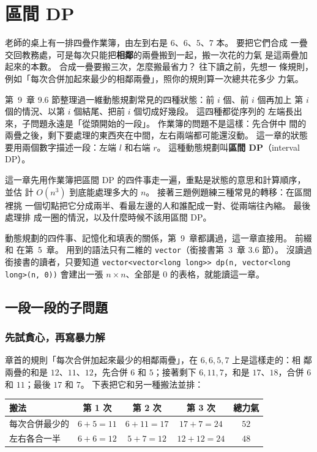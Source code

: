 \chapter{區間 DP}
\label{ch:interval-dp}

老師的桌上有一排四疊作業簿，由左到右是 $6$、$6$、$5$、$7$ 本。 要把它們合成
一疊交回教務處，可是每次只能把\textbf{相鄰}的兩疊搬到一起，搬一次花的力氣
是這兩疊加起來的本數。 合成一疊要搬三次，怎麼搬最省力？ 往下讀之前，先想一
條規則，例如「每次合併加起來最少的相鄰兩疊」，照你的規則算一次總共花多少
力氣。

第~9~章 9.6 節整理過一維動態規劃常見的四種狀態：前 $i$ 個、前 $i$ 個再加上
第 $i$ 個的情況、以第 $i$ 個結尾、把前 $i$ 個切成好幾段。 這四種都從序列的
左端長出來，子問題永遠是「從頭開始的一段」。 作業簿的問題不是這樣：先合併中
間的兩疊之後，剩下要處理的東西夾在中間，左右兩端都可能還沒動。 這一章的狀態
要用兩個數字描述一段：左端 $l$ 和右端 $r$。 這種動態規劃叫\textbf{區間
DP}（interval DP）。

這一章先用作業簿把區間 DP 的四件事走一遍，重點是狀態的意思和計算順序，並估
計 $O(n^3)$ 到底能處理多大的 $n$。 接著三題例題練三種常見的轉移：在區間裡挑
一個切點把它分成兩半、看最左邊的人和誰配成一對、從兩端往內縮。 最後處理排
成一圈的情況，以及什麼時候不該用區間 DP。

動態規劃的四件事、記憶化和填表的關係，第~9~章都講過，這一章直接用。 前綴和
在第~5~章。 用到的語法只有二維的 \texttt{vector}（銜接書第~3~章 3.6 節）。
沒讀過銜接書的讀者，只要知道 \texttt{vector<vector<long long>> dp(n, vector<long long>(n, 0))}
會建出一張 $n \times n$、全部是 $0$ 的表格，就能讀這一章。

\section{一段一段的子問題}
\label{sec:ivdp-basic}

\subsection{先試貪心，再寫暴力解}

章首的規則「每次合併加起來最少的相鄰兩疊」，在 $6, 6, 5, 7$ 上是這樣走的：相
鄰兩疊的和是 $12$、$11$、$12$，先合併 $6$ 和 $5$；接著剩下 $6, 11, 7$，和是
$17$、$18$，合併 $6$ 和 $11$；最後 $17$ 和 $7$。 下表把它和另一種搬法並排：

\begin{center}
\begin{tabular}{lccc|c}
\toprule
搬法 & 第 1 次 & 第 2 次 & 第 3 次 & 總力氣 \\
\midrule
每次合併最少的 & $6 + 5 = 11$ & $6 + 11 = 17$ & $17 + 7 = 24$ & $52$ \\
左右各合一半 & $6 + 6 = 12$ & $5 + 7 = 12$ & $12 + 12 = 24$ & $48$ \\
\bottomrule
\end{tabular}
\end{center}

